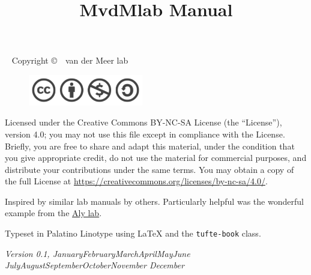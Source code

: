 \documentclass{tufte-book}
\title{MvdMlab Manual}
\newcommand{\monthyear}{%
  \ifcase\month\or January\or February\or March\or April\or May\or June\or
  July\or August\or September\or October\or November\or
  December\fi\space\number\year
}
\newcommand{\openepigraph}[2]{%
  \begin{fullwidth}
  \sffamily\large
  \begin{doublespace}
  \noindent\allcaps{#1}\\%
  \noindent\allcaps{#2}%
  \end{doublespace}
  \end{fullwidth}
}
\newcommand{\blankpage}{\newpage\hbox{}\thispagestyle{empty}\newpage}
\newcommand{\doccls}[1]{\texttt{#1}}%
\begin{document}



\maketitle

\newpage
\begin{fullwidth}
~\vfill
\thispagestyle{empty}
\setlength{\parindent}{0pt}
\setlength{\parskip}{\baselineskip}
Copyright \copyright\ \the\year\ van der Meer lab

\par{}

\begin{figure}
  \includegraphics[width=5cm]{images/license.png}
\end{figure}


\par Licensed under the Creative Commons BY-NC-SA License (the
``License''), version 4.0; you may not use this file except in
compliance with the License. Briefly, you are free to share and adapt
this material, under the condition that you give appropriate credit,
do not use the material for commercial purposes, and distribute your
contributions under the same terms. You may obtain a copy of the full
License at \url{https://creativecommons.org/licenses/by-nc-sa/4.0/}.

\par Inspired by similar lab manuals by others. Particularly helpful
was the wonderful example from the
\href{https://github.com/alylab/labmanual}{Aly lab}.

\par Typeset in Palatino Linotype using \LaTeX{} and the
\doccls{tufte-book} class.

\par\textit{Version 0.1, \monthyear}
\end{fullwidth}
\end{document}
